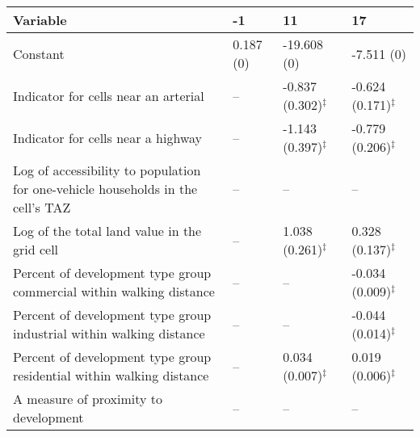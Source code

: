 
\begin{tabular}{p{3in}p{0.5in}p{0.5in}p{0.5in}}
\hline\hline
Variable & -1 & 11 & 17 \\\hline
Constant & 0.187 (0) & -19.608 (0) & -7.511 (0) \\
Indicator for cells near an arterial & -- & -0.837 (0.302)$^{\ddagger}$ & -0.624 (0.171)$^{\ddagger}$ \\
Indicator for cells near a highway & -- & -1.143 (0.397)$^{\ddagger}$ & -0.779 (0.206)$^{\ddagger}$ \\
Log of accessibility to population for one-vehicle households in the cell's TAZ & -- & -- & -- \\
Log of the total land value in the grid cell & -- & 1.038 (0.261)$^{\ddagger}$ & 0.328 (0.137)$^{\ddagger}$ \\
Percent of development type group commercial within walking distance & -- & -- & -0.034 (0.009)$^{\ddagger}$ \\
Percent of development type group industrial within walking distance & -- & -- & -0.044 (0.014)$^{\ddagger}$ \\
Percent of development type group residential within walking distance & -- & 0.034 (0.007)$^{\ddagger}$ & 0.019 (0.006)$^{\ddagger}$ \\
A measure of proximity to development & -- & -- & -- \\
\hline\hline
\end{tabular}
